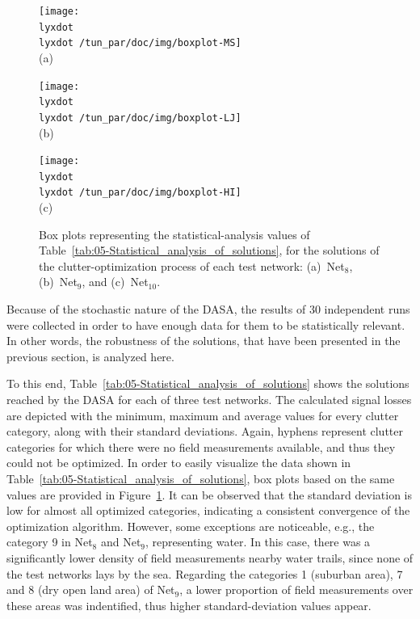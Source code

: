 \begin{figure}
\centering

\texttt{[image: \\lyxdot \\lyxdot /tun\_par/doc/img/boxplot-MS]}\\\hspace*{0.2in}(a)

\texttt{[image: \\lyxdot \\lyxdot /tun\_par/doc/img/boxplot-LJ]}\\\hspace*{0.2in}(b)

\texttt{[image: \\lyxdot \\lyxdot /tun\_par/doc/img/boxplot-HI]}\\\hspace*{0.2in}(c)

\caption{Box plots representing the statistical-analysis values of Table~\ref{tab:05-Statistical_analysis_of_solutions},
for the solutions of the clutter-optimization process of each test
network: (a)~Net$_{8}$, (b)~Net$_{9}$, and (c)~Net$_{10}$.\label{fig:05-Statistical_analysis_boxplots}}
\end{figure}


\bigskip{}


Because of the stochastic nature of the DASA, the results of 30 independent
runs were collected in order to have enough data for them to be statistically
relevant. In other words, the robustness of the solutions, that have
been presented in the previous section, is analyzed here.

To this end, Table~\ref{tab:05-Statistical_analysis_of_solutions}
shows the solutions reached by the DASA for each of three test networks.
The calculated signal losses are depicted with the minimum, maximum
and average values for every clutter category, along with their standard
deviations. Again, hyphens represent clutter categories for which
there were no field measurements available, and thus they could not
be optimized. In order to easily visualize the data shown in Table~\ref{tab:05-Statistical_analysis_of_solutions},
box plots based on the same values are provided in Figure~\ref{fig:05-Statistical_analysis_boxplots}.
It can be observed that the standard deviation is low for almost all
optimized categories, indicating a consistent convergence of the optimization
algorithm. However, some exceptions are noticeable, e.g., the category
9 in Net$_{8}$ and Net$_{9}$, representing water. In this case,
there was a significantly lower density of field measurements nearby
water trails, since none of the test networks lays by the sea. Regarding
the categories 1 (suburban area), 7 and 8 (dry open land area) of
Net$_{9}$, a lower proportion of field measurements over these areas
was indentified, thus higher standard-deviation values appear.

